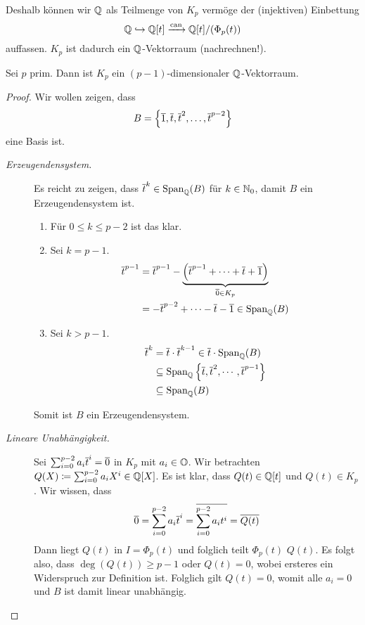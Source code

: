 \documentclass[12pt,a4paper]{scrartcl}
\begin{document}
Deshalb können wir $\mathbb Q$ als Teilmenge von $K_p$ vermöge der (injektiven) Einbettung \[\mathbb Q \hookrightarrow \mathbb Q[t] \xrightarrow{\operatorname{can}} \mathbb Q[t]/(\Phi_p(t))\] auffassen. $K_p$ ist dadurch ein $\mathbb Q$-Vektorraum (nachrechnen!).

\begin{lem} \label{lem:kreisteilkoerpervekraum}
	Sei $p$ prim. Dann ist $K_p$ ein $(p-1)$-dimensionaler $\mathbb Q$-Vektorraum.
\end{lem}

\begin{proof}
	Wir wollen zeigen, dass
	\begin{equation*}
		B = \left\lbrace \overline{1}, \overline{t}, \overline{t}^2, \dots, \overline{t}^{p-2} \right\rbrace 
	\end{equation*}
	eine Basis ist.
	
	\begin{description}
		\item[\emph{Erzeugendensystem.}] Es reicht zu zeigen, dass $\overline{t}^k \in \operatorname{Span}_{\mathbb Q}(B)$ für $k \in \mathbb N_0$, damit $B$ ein Erzeugendensystem ist.
		\begin{enumerate}
			\item Für $0 \leq k \leq p-2$ ist das klar.
			\item Sei $k = p-1$. 
			\begin{align*}
			\overline{t}^{p-1} &= \overline{t}^{p-1}- \underbrace{\left( \overline{t}^{p-1} + \dots + \overline{t} + \overline{1} \right)}_{\overline{0} \in K_p} \\
			&= - \overline{t}^{p-2} + \dots - \overline{t} - \overline{1} \in \operatorname{Span}_{\mathbb Q}(B)
			\end{align*}
			\item Sei $k > p-1$.
			\begin{align*}
			\overline{t}^k &= \overline{t} \cdot \overline{t}^{k-1} \in \overline{t} \cdot \operatorname{Span}_{\mathbb Q}(B) \\
			&\subseteq \operatorname{Span}_{\mathbb Q}\left\lbrace \overline{t}, \overline{t}^2, \cdots , \overline{t} ^ {p-1} \right\rbrace \\
			&\subseteq \operatorname{Span}_{\mathbb Q}(B)
			\end{align*}
		\end{enumerate}
		Somit ist $B$ ein Erzeugendensystem.
		\item[\emph{Lineare Unabhängigkeit.}] Sei $\sum_{i=0}^{p-2}a_i\overline{t}^i = \overline{0}$ in $K_p$ mit $a_i \in \mathbb O$. Wir betrachten $Q(X) \coloneqq \sum_{i=0}^{p-2}a_iX^i \in \mathbb Q[X]$. Es ist klar, dass $Q(t) \in \mathbb Q[t]$ und $Q(t) \in K_p$. Wir wissen, dass
		\[
		\overline{0} = \sum_{i=0}^{p-2}a_i\overline{t}^i = \overline{\sum_{i=0}^{p-2}a_it^i} = \overline{Q(t)}
		\]
		Dann liegt $Q(t)$ in $I = \Phi_p(t)$ und folglich teilt $\Phi_p(t)$ $Q(t)$. Es folgt also, dass $\deg(Q(t)) \geq p-1$ oder $Q(t) = 0$, wobei ersteres ein Widerspruch zur Definition ist. Folglich gilt $Q(t) = 0$, womit alle $a_i = 0$ und $B$ ist damit linear unabhängig.
  \qedhere
	\end{description}
\end{proof}
\end{document}
